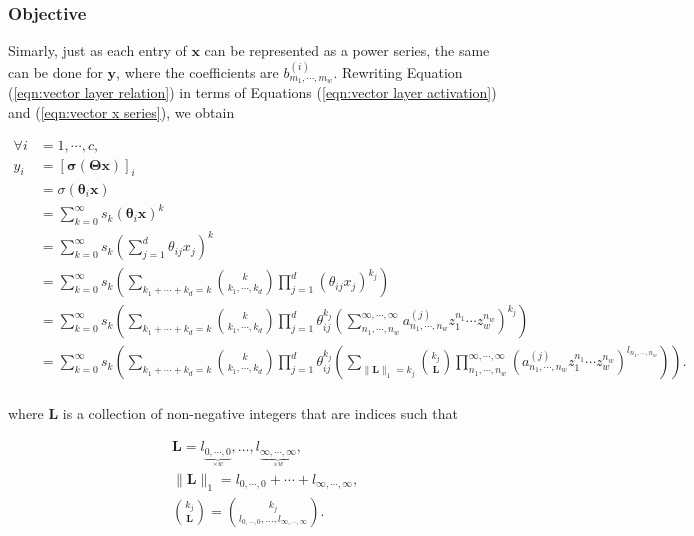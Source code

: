 \subsubsection{Objective}

Simarly, just as each entry of $\mathbf{x}$ can be represented as a power series, the same can be done for $\mathbf{y}$, where the coefficients are $b^{(i)}_{m_1, \cdots, m_w}$. Rewriting Equation (\ref{eqn:vector layer relation}) in terms of Equations (\ref{eqn:vector layer activation}) and (\ref{eqn:vector x series}), we obtain

\begin{align}
    \forall i &= 1, \cdots, c, \nonumber \\ y_i
    &= \left[\mathbf{\sigma}(\mathbf{\Theta} \mathbf{x})\right]_i \nonumber \\
    &= \sigma(\mathbf{\theta}_i \mathbf{x}) \nonumber \\
    &= \sum_{k=0}^{\infty} s_k (\mathbf{\theta}_i \mathbf{x})^k \nonumber \\
    &= \sum_{k=0}^{\infty} s_k \left(\sum_{j=1}^{d} \theta_{ij} x_{j}\right)^k \nonumber \\
    &= \sum_{k=0}^{\infty} s_k \left(\sum_{k_1 + \cdots + k_d = k} \binom{k}{k_1, \cdots, k_d} \prod_{j=1}^{d} (\theta_{ij} x_j)^{k_j} \right) \nonumber \\
    &= \sum_{k=0}^{\infty} s_k \left(\sum_{k_1 + \cdots + k_d = k} \binom{k}{k_1, \cdots, k_d} \prod_{j=1}^{d}\theta_{ij}^{k_j} \left(\sum_{n_1, \cdots, n_w}^{\infty,
    \cdots, \infty} a^{(j)}_{n_1,\cdots,n_w} z_1^{n_1}  \cdots z_w^{n_w} \right)^{k_j}\right) \nonumber \\
    &= \sum_{k=0}^{\infty} s_k \left(\sum_{k_1 + \cdots + k_d = k} \binom{k}{k_1, \cdots, k_d} \prod_{j=1}^{d} \theta_{ij}^{k_j} \left(\sum_{\lVert \mathbf{L} \rVert_1 = k_j} \binom{k_j}{\mathbf{L}} \prod_{n_1, \cdots, n_w}^{\infty, \cdots, \infty} (a^{(j)}_{n_1, \cdots, n_w} z_1^{n_1} \cdots z_w^{n_w})^{l_{n_1, \cdots, n_w}} \right)\right). \nonumber \\
    \label{eqn:vector y expansion}
\end{align}

where $\mathbf{L}$ is a collection of non-negative integers that are indices such that

\begin{align*}
    &\mathbf{L} = l_{\underbrace{0, \cdots, 0}_{\times w}}, \ldots, l_{\underbrace{\infty, \cdots, \infty}_{\times w}}, \\
    &\lVert \mathbf{L} \rVert_1 = l_{0, \cdots, 0} + \cdots + l_{\infty, \cdots, \infty}, \\
    &\binom{k_j}{\mathbf{L}} = \binom{k_j}{l_{0, \cdots, 0}, \ldots, l_{\infty, \cdots, \infty}}.
\end{align*}

